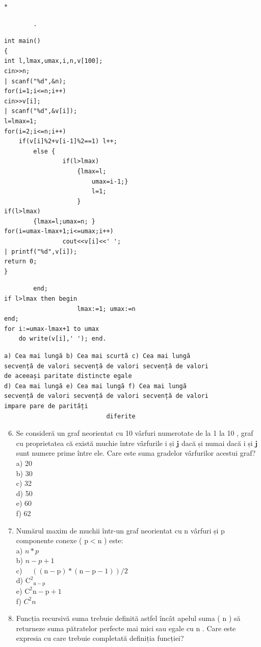 \documentclass[10pt]{article}
\begin{document}
\begin{verbatim}
*
\end{verbatim}

\begin{verbatim}
        .
\end{verbatim}

\begin{verbatim}
int main()
{
int l,lmax,umax,i,n,v[100];
cin>>n;
| scanf("%d",&n);
for(i=1;i<=n;i++)
cin>>v[i];
| scanf("%d",&v[i]);
l=lmax=1;
for(i=2;i<=n;i++)
    if(v[i]%2+v[i-1]%2==1) l++;
        else {
                if(l>lmax)
                    {lmax=l;
                        umax=i-1;}
                        l=1;
                    }
if(l>lmax)
        {lmax=l;umax=n; }
for(i=umax-lmax+1;i<=umax;i++)
                cout<<v[i]<<' ';
| printf("%d",v[i]);
return 0;
}
\end{verbatim}

\begin{verbatim}
        end;
if l>lmax then begin
                    lmax:=1; umax:=n
end;
for i:=umax-lmax+1 to umax
    do write(v[i],' '); end.
\end{verbatim}

\begin{verbatim}
a) Cea mai lungă b) Cea mai scurtă c) Cea mai lungă
secvență de valori secvență de valori secvență de valori
de aceeași paritate distincte egale
d) Cea mai lungă e) Cea mai lungă f) Cea mai lungă
secvență de valori secvență de valori secvență de valori
impare pare de parități
                            diferite
\end{verbatim}

\begin{enumerate}
  \setcounter{enumi}{5}
  \item Se consideră un graf neorientat cu 10 vârfuri numerotate de la 1 la 10 , graf cu proprietatea că există muchie între vârfurile i și $\mathbf{j}$ dacă și numai dacă i și $\mathbf{j}$ sunt numere prime între ele. Care este suma gradelor vârfurilor acestui graf?\\
a) 20\\
b) 30\\
c) 32\\
d) 50\\
e) 60\\
f) 62
  \item Numărul maxim de muchii într-un graf neorientat cu n vârfuri și p componente conexe ( $\mathrm{p}<\mathrm{n}$ ) este:\\
a) $n * p$\\
b) $n-p+1$\\
c) $\quad((\mathrm{n}-\mathrm{p}) *(\mathrm{n}-\mathrm{p}-1)) / 2$\\
d) $\mathrm{C}^{2}{ }_{\mathrm{n}-\mathrm{p}}$\\
e) $\mathrm{C}^{2} \mathrm{n}-\mathrm{p}+1$\\
f) $C^{2} n$
  \item Funcția recursivă suma trebuie definită astfel încât apelul suma ( n ) să returneze suma pătratelor perfecte mai mici sau egale cu n . Care este expresia cu care trebuie completată definiția funcției?
\end{enumerate}
\end{document}

